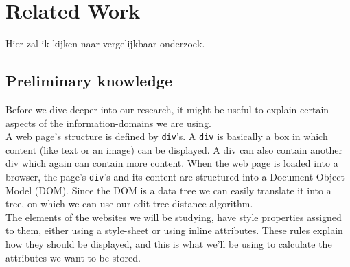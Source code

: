 \chapter{Related Work}\label{relatedwork}
Hier zal ik kijken naar vergelijkbaar onderzoek.

\section{Preliminary knowledge}
Before we dive deeper into our research, it might be useful to explain certain aspects of the information-domains we are using.
\\ A web page's structure is defined by \texttt{div}'s. A \texttt{div} is basically a box in which content (like text or an image) can be displayed. A div can also contain another div which again can contain more content. When the web page is loaded into a browser, the page's \texttt{div}'s and its content are structured into a Document Object Model (DOM). Since the DOM is a data tree we can easily translate it into a tree, on which we can use our edit tree distance algorithm.
\\ The elements of the websites we will be studying, have style properties assigned to them, either using a style-sheet or using inline attributes. These rules explain how they should be displayed, and this is what we'll be using to calculate the attributes we want to be stored.
